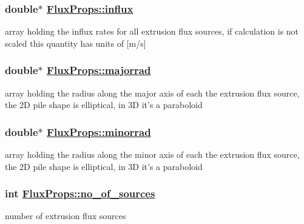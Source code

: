 \hypertarget{structFluxProps_o1}{
\subsubsection[influx]{\setlength{\rightskip}{0pt plus 5cm}double$\ast$ \hyperlink{structFluxProps_o1}{Flux\-Props::influx}}}
\label{structFluxProps_o1}


array holding the influx rates for all extrusion flux sources, if calculation is not scaled this quantity has units of \mbox{[}m/s\mbox{]} 

\hypertarget{structFluxProps_o6}{
\subsubsection[majorrad]{\setlength{\rightskip}{0pt plus 5cm}double$\ast$ \hyperlink{structFluxProps_o6}{Flux\-Props::majorrad}}}
\label{structFluxProps_o6}


array holding the radius along the major axis of each the extrusion flux source, the 2D pile shape is elliptical, in 3D it's a paraboloid 

\hypertarget{structFluxProps_o7}{
\subsubsection[minorrad]{\setlength{\rightskip}{0pt plus 5cm}double$\ast$ \hyperlink{structFluxProps_o7}{Flux\-Props::minorrad}}}
\label{structFluxProps_o7}


array holding the radius along the minor axis of each the extrusion flux source, the 2D pile shape is elliptical, in 3D it's a paraboloid 

\hypertarget{structFluxProps_o0}{
\subsubsection[no\_\-of\_\-sources]{\setlength{\rightskip}{0pt plus 5cm}int \hyperlink{structFluxProps_o0}{Flux\-Props::no\_\-of\_\-sources}}}
\label{structFluxProps_o0}


number of extrusion flux sources 

